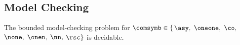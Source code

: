 \subsection{Model Checking}

\begin{theorem}
	\label{thm:bounded_model_checking}
	The bounded model-checking problem for $\comsymb \in \{$$\asy, $ $\oneone, $ $\co, $ $\none, $ $\onen, $ $\nn, $ $\rsc\}$ is decidable.
\end{theorem}

\begin{comment}

Knowing that $\coMSCs$ is MSO-definable, Theorem~\ref{thm:mailbox_bounded_model_checking} can be restated for $\comsymb = \cosymb$.

\begin{theorem}
	\label{thm:co_bounded_model_checking}
	The bounded model-checking problem for $\comsymb =  \cosymb$ is decidable.
\end{theorem}
\begin{proof}
By Proposition~\ref{prop:co_mso}, $\coMSCs=L(\coformula)$. Given a system $\System$, we have that $\coL{\System} = \ppL{\System} \cap L(\coformula)$. Therefore, we can rewrite the bounded model checking problem for $\comsymb = \cosymb$ as

\[\begin{array}{rl}
&\coL{\System} \cap \stwMSCs{k} \subseteq L(\phi)\\[1ex]
\Longleftrightarrow &\ppL{\System} \cap L(\coformula) \cap \stwMSCs{k} \subseteq L(\phi)\\[1ex]
\Longleftrightarrow &\ppL{\System} \cap \stwMSCs{k} \subseteq L(\phi) \cup L(\neg \coformula)\\[1ex]
\Longleftrightarrow &\ppL{\System} \cap \stwMSCs{k} \subseteq L(\phi \vee \neg \coformula)\,.
\end{array}\]
The latter is decidable due to Fact~\ref{p2p}.
\end{proof}

\begin{theorem}
	\label{thm:onen_bounded_model_checking}
	The bounded model-checking problem for $\comsymb =  \onensymb$ is decidable.
\end{theorem}
\begin{proof}
By Proposition~\ref{prop:onen_mso}, $\onenMSCs=L(\onenformula)$. Given a system $\System$, we have that $\onenL{\System} = \ppL{\System} \cap L(\onenformula)$. Therefore, we can rewrite the bounded model checking problem for $\comsymb = \onensymb$ as


\end{comment}
